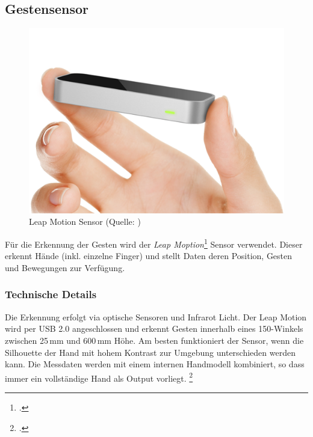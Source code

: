 \subsection{Gestensensor} \label{subsec:leapmotion}
\begin{figure}
	\includegraphics[width=1.0\linewidth]{images/analysis/leap_simple.png}
	\caption[Leap Motion Sensor]{Leap Motion Sensor (Quelle: )}
\end{figure}

Für die Erkennung der Gesten wird der \textit{Leap Moption}\footcite{Leap_Motion_Motion_Controller_2015-03-27} Sensor verwendet.
Dieser erkennt Hände (inkl. einzelne Finger) und stellt Daten deren Position, Gesten und Bewegungen zur Verfügung.

\subsubsection{Technische Details}
Die Erkennung erfolgt via optische Sensoren und Infrarot Licht.
Der Leap Motion wird per USB 2.0 angeschlossen und erkennt Gesten innerhalb eines 150\textdegree-Winkels zwischen 25\,mm und 600\,mm Höhe.
Am besten funktioniert der Sensor, wenn die Silhouette der Hand mit hohem Kontrast zur Umgebung unterschieden werden kann.
Die Messdaten werden mit einem internen Handmodell kombiniert, so dass immer ein vollständige Hand als Output vorliegt.
\footcite{API_Overview__Leap_Motion_v2.2_documentation_2015-03-27}


